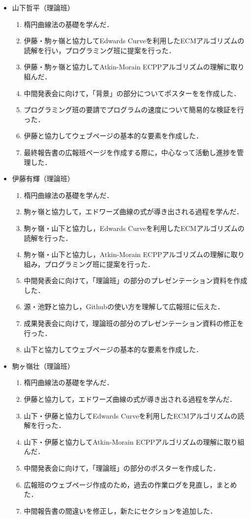 \documentclass[openany,11pt,papersize]{jsbook}
\begin{document}
\begin{itemize}
\item 山下哲平（理論班）
 \begin{enumerate}
 \renewcommand{\labelenumi}{(\arabic{enumi})}
 \item 楕円曲線法の基礎を学んだ．
 \item 伊藤・駒ヶ嶺と協力してEdwards Curveを利用したECMアルゴリズムの読解を行い，プログラミング班に提案を行った．
 \item 伊藤・駒ヶ嶺と協力してAtkin-Morain ECPPアルゴリズムの理解に取り組んだ．
 \item 中間発表会に向けて，「背景」の部分についてポスターをを作成した．
 \item プログラミング班の要請でプログラムの速度について簡易的な検証を行った．
 \item 伊藤と協力してウェブページの基本的な要素を作成した．
 \item 最終報告書の広報班ページを作成する際に，中心なって活動し進捗を管理した．
 \end{enumerate}
 
\item 伊藤有輝（理論班）
 \begin{enumerate}
 \renewcommand{\labelenumi}{(\arabic{enumi})}
 \item 楕円曲線法の基礎を学んだ．
 \item 駒ヶ嶺と協力して，エドワーズ曲線の式が導き出される過程を学んだ．
 \item 駒ヶ嶺・山下と協力し，Edwards Curveを利用したECMアルゴリズムの読解を行った．
 \item 駒ヶ嶺・山下と協力し，Atkin-Morain ECPPアルゴリズムの理解に取り組み，プログラミング班に提案を行った．
 \item 中間発表会に向けて，「理論班」の部分のプレゼンテーション資料を作成した．
 \item 源・池野と協力し，Githubの使い方を理解して広報班に伝えた．
 \item 成果発表会に向けて，理論班の部分のプレゼンテーション資料の修正を行った．
 \item 山下と協力してウェブページの基本的な要素を作成した．

 \end{enumerate}
 
\item 駒ヶ嶺壮（理論班）
 \begin{enumerate}
 \renewcommand{\labelenumi}{(\arabic{enumi})}
 \item 楕円曲線法の基礎を学んだ．
 \item 伊藤と協力して，エドワーズ曲線の式が導き出される過程を学んだ．
 \item 山下・伊藤と協力してEdwards Curveを利用したECMアルゴリズムの読解を行った．
 \item 山下・伊藤と協力してAtkin-Morain ECPPアルゴリズムの理解に取り組んだ．
 \item 中間発表会に向けて，「理論班」の部分のポスターを作成した．
 \item 広報班のウェブページ作成のため，過去の作業ログを見直し，まとめた．
 \item 中間報告書の間違いを修正し，新たにセクションを追加した．
 \end{enumerate}
 

\end{itemize}
\end{document}
